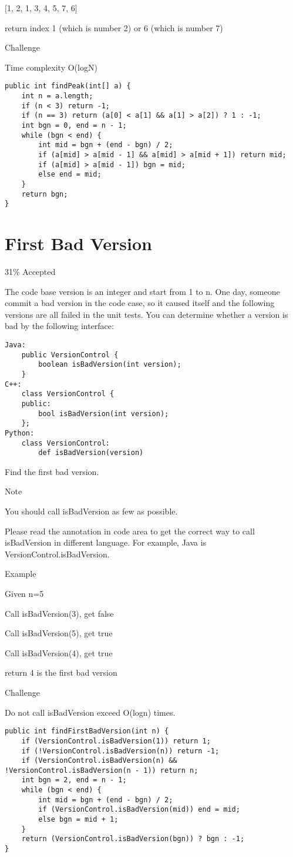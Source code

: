 \documentclass[9pt, b5paaper]{book}
\begin{document}
[1, 2, 1, 3, 4, 5, 7, 6]

return index 1 (which is number 2)  or 6 (which is number 7)

Challenge

Time complexity O(logN)
\begin{verbatim}
public int findPeak(int[] a) {
    int n = a.length;
    if (n < 3) return -1;
    if (n == 3) return (a[0] < a[1] && a[1] > a[2]) ? 1 : -1;
    int bgn = 0, end = n - 1;
    while (bgn < end) {
        int mid = bgn + (end - bgn) / 2;
        if (a[mid] > a[mid - 1] && a[mid] > a[mid + 1]) return mid;
        if (a[mid] > a[mid - 1]) bgn = mid;
        else end = mid;
    }
    return bgn;
}
\end{verbatim}
\section{First Bad Version}
\label{sec-1-31}

31\% Accepted

The code base version is an integer and start from 1 to n. One day, someone commit a bad version in the code case, so it caused itself and the following versions are all failed in the unit tests.
You can determine whether a version is bad by the following interface: 
\begin{verbatim}
Java:
    public VersionControl {
        boolean isBadVersion(int version);
    }
C++:
    class VersionControl {
    public:
        bool isBadVersion(int version);
    };
Python:
    class VersionControl:
        def isBadVersion(version)
\end{verbatim}

Find the first bad version.

Note

You should call isBadVersion as few as possible. 

Please read the annotation in code area to get the correct way to call isBadVersion in different language. For example, Java is VersionControl.isBadVersion.

Example

Given n=5

Call isBadVersion(3), get false

Call isBadVersion(5), get true

Call isBadVersion(4), get true

return 4 is the first bad version

Challenge

Do not call isBadVersion exceed O(logn) times.
\begin{verbatim}
public int findFirstBadVersion(int n) {
    if (VersionControl.isBadVersion(1)) return 1;
    if (!VersionControl.isBadVersion(n)) return -1;
    if (VersionControl.isBadVersion(n) && !VersionControl.isBadVersion(n - 1)) return n;
    int bgn = 2, end = n - 1;
    while (bgn < end) {
        int mid = bgn + (end - bgn) / 2;
        if (VersionControl.isBadVersion(mid)) end = mid;
        else bgn = mid + 1;
    }
    return (VersionControl.isBadVersion(bgn)) ? bgn : -1;
}
\end{verbatim}
\end{document}
